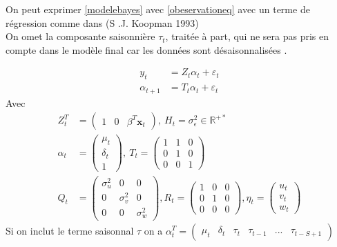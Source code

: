 \documentclass{article}
\theoremstyle{definition}
\theoremstyle{remark}
\begin{document}
On peut exprimer \ref{modelebayes} avec \ref{obeservationeq} avec un terme de régression comme dans \cite{kapman1993} 
(S .J. Koopman 1993) \\
On omet la composante saisonnière $\tau_{t}$, traitée à part, qui ne sera pas pris en compte dans le modèle final car les données sont 
\og désaisonnalisées \fg{}.

\begin{equation}
\begin{aligned} y_{t} &= Z_{t} \alpha_{t}+ \varepsilon_{t}\\ 
\alpha_{t+1} &= T_{t} \alpha_{t}+ \varepsilon_{t}
\end{aligned}
\end{equation}
Avec 
\[
\begin{aligned}
	Z_{t}^{T} &= (\begin{array}{lll}{1} & {0} & {\beta^{T} \mathbf{x}_{t}}\end{array}), \
	H_t = \sigma_{\epsilon}^{2} \in \mathbb{R}^{+*} \\
\alpha_{t} &= \left(\begin{array}{c}{\mu_{t}} \\ {\delta_{t}} \\ {1}\end{array}\right) , \
T_t = \left(\begin{array}{lll}{1} & {1} & {0} \\ {0} & {1} & {0} \\ {0} & {0} & {1}\end{array}\right) \\
Q_t &= \left(
	\begin{array}{lll}{
		\sigma_{u}^{2}} & {0} & {0} \\
		 {0} & {\sigma_{v}^{2}} & {0} \\
		  {0} & {0} & {\sigma_{w}^{2}}
	\end{array}
	\right), 
R_{t} = \left(\begin{array}{lll}{1} & {0} & {0} \\ {0} & {1} & {0} \\ {0} & {0} & {0}\end{array}\right),
\eta_{t} = \left(\begin{array}{c}{u_{t}} \\ {v_{t}} \\ {w_t}\end{array}\right)
\end{aligned}
\]
Si on inclut le terme saisonnal $\tau$ on a 
$\alpha_{t}^{T} = (\begin{array}{llllll}{\mu_{t}} & {\delta_{t}} & {\tau_{t}} & {\tau_{t-1}} & ...&  {\tau_{t-S+1}}\end{array})$
\end{document}
